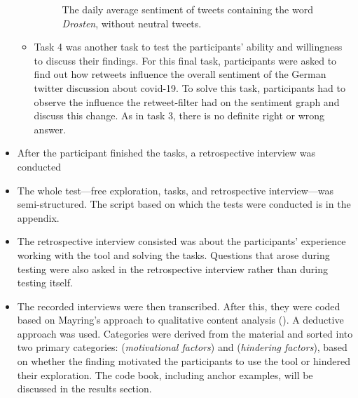\begin{itemize}
\begin{itemize}
        \begin{figure}[h!tb]
            \caption{The daily average sentiment of tweets containing the word \emph{Drosten}, without neutral tweets.}
            \label{fig:sentiment_drosten_noneutral}
        \end{figure}
        \item Task 4 was another task to test the participants' ability and willingness to discuss their findings. %
        For this final task, participants were asked to find out how retweets influence the overall sentiment of the German twitter discussion about covid-19. To solve this task, participants had to observe the influence the retweet-filter had on the sentiment graph and discuss this change. As in task 3, there is no definite right or wrong answer.
    \end{itemize}
    \item After the participant finished the tasks, a retrospective interview was conducted
    \item The whole test---free exploration, tasks, and retrospective interview---was semi-structured. The script based on which the tests were conducted is in the appendix.
    \item The retrospective interview consisted was about the participants' experience working with the tool and solving the tasks. Questions that arose during testing were also asked in the retrospective interview rather than during testing itself.
    \item The recorded interviews were then transcribed. After this, they were coded based on Mayring's approach to qualitative content analysis (\cite{mayring2010qualitative}). A deductive approach was used. Categories were derived from the material and sorted into two primary categories:  (\emph{motivational factors}) and  (\emph{hindering factors}), based on whether the finding motivated the participants to use the tool or hindered their exploration. The code book, including anchor examples, will be discussed in the results section.
\end{itemize}
